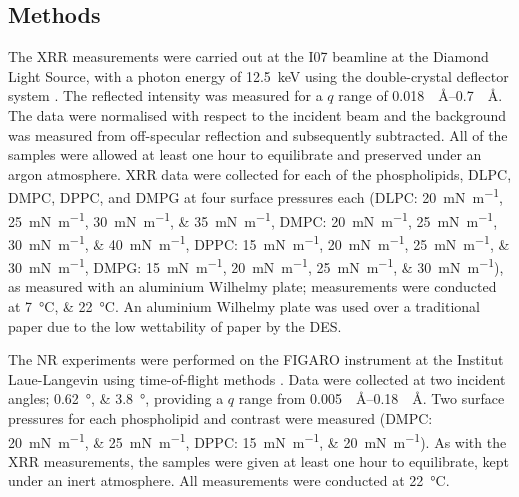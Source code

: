 \subsection{Methods}
The XRR measurements were carried out at the I07 beamline at the Diamond Light Source, with a photon energy of \SI{12.5}{\kilo\electronvolt} using the double-crystal deflector system \cite{arnold_implementation_2012}.
The reflected intensity was measured for a $q$ range of \SIrange{0.018}{0.7}{\per\angstrom}.
The data were normalised with respect to the incident beam and the background was measured from off-specular reflection and subsequently subtracted.
All of the samples were allowed at least one hour to equilibrate and preserved under an argon atmosphere.
XRR data were collected for each of the phospholipids, DLPC, DMPC, DPPC, and DMPG at four surface pressures each (DLPC: \SIlist{20;25;30;35}{\milli\newton\per\meter}, DMPC: \SIlist{20;25;30;40}{\milli\newton\per\meter}, DPPC: \SIlist{15;20;25;30}{\milli\newton\per\meter}, DMPG: \SIlist{15;20;25;30}{\milli\newton\per\meter}), as measured with an aluminium Wilhelmy plate; measurements were conducted at \SIlist{7;22}{\celsius}.
An aluminium Wilhelmy plate was used over a traditional paper due to the low wettability of paper by the DES.

The NR experiments were performed on the FIGARO instrument at the Institut Laue-Langevin using time-of-flight methods \cite{campbell_figaro_2011}.
Data were collected at two incident angles; \SIlist{0.62;3.8}{\degree}, providing a $q$ range from \SIrange{0.005}{0.18}{\per\angstrom}.
Two surface pressures for each phospholipid and contrast were measured (DMPC: \SIlist{20;25}{\milli\newton\per\meter}, DPPC: \SIlist{15;20}{\milli\newton\per\meter}).
As with the XRR measurements, the samples were given at least one hour to equilibrate, kept under an inert atmosphere.
All measurements were conducted at \SI{22}{\celsius}.
